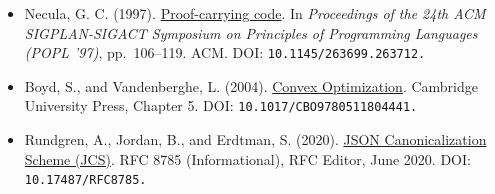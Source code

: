 \documentclass[
  11pt,
]{article}
\providecommand{\tightlist}{%
  \setlength{\itemsep}{0pt}\setlength{\parskip}{0pt}}
\begin{document}
\begin{itemize}
\tightlist
\item
  Necula, G. C. (1997).
  \href{https://doi.org/10.1145/263699.263712}{Proof-carrying code}. In
  \emph{Proceedings of the 24th ACM SIGPLAN-SIGACT Symposium on
  Principles of Programming Languages (POPL '97)}, pp.~106--119. ACM.
  DOI: \nolinkurl{10.1145/263699.263712.}
\item
  Boyd, S., and Vandenberghe, L. (2004).
  \href{https://doi.org/10.1017/CBO9780511804441}{Convex Optimization}.
  Cambridge University Press, Chapter 5. DOI:
  \nolinkurl{10.1017/CBO9780511804441.}
\item
  Rundgren, A., Jordan, B., and Erdtman, S. (2020).
  \href{https://www.rfc-editor.org/rfc/rfc8785}{JSON Canonicalization
  Scheme (JCS)}. RFC 8785 (Informational), RFC Editor, June 2020. DOI:
  \nolinkurl{10.17487/RFC8785.}
\end{itemize}
\end{document}
